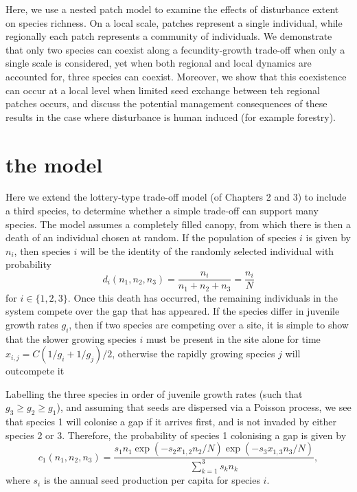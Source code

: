 Here, we use a nested patch model to examine the effects of disturbance extent on species richness. On a local scale, patches represent a single individual, while regionally each patch represents a community of individuals. We demonstrate that only two species can coexist along a fecundity-growth trade-off when only a single scale is considered, yet when both regional and local dynamics are accounted for, three species can coexist. Moreover, we show that this coexistence can occur at a local level when limited seed exchange between teh regional patches occurs, and discuss the potential management consequences of these results in the case where disturbance is human induced (for example forestry).



\section{the model}
Here we extend the lottery-type trade-off model (of Chapters 2 and 3) to include a third species, to determine whether a simple trade-off can support many species. The model assumes a completely filled canopy, from which there is then a death of an individual chosen at random. If the population of species $i$ is given by $n_i$, then species $i$ will be the identity of the randomly selected individual with probability
\begin{equation}
\label{d}
d_i(n_1,n_2,n_3)=\frac{n_i}{n_1+n_2+n_3}=\frac{n_i}{N} \end{equation}
for $i \in \{1,2,3\}$. Once this death has occurred, the remaining individuals in the system compete over the gap that has appeared. If the species differ in juvenile growth rates $g_i$, then if two species are competing over a site, it is simple to show that the slower growing species $i$ must be present in the site alone for time $x_{i,j}=C(1/g_i +1/g_j)/2$, otherwise the rapidly growing species $j$ will outcompete it

Labelling the three species in order of juvenile growth rates (such that $g_3 \geq g_2\geq g_1$), and assuming that seeds are dispersed via a Poisson process, we see that species 1 will colonise a gap if it arrives first, and is not invaded by either species 2 or 3. Therefore, the probability of species 1 colonising a gap is given by
\begin{equation}
\label{c1}
c_1(n_1,n_2,n_3)=\frac{s_1 n_1 \exp(-s_2x_{1,2}n_2/N)\exp(-s_3x_{1,3}n_3/N)}{\sum_{k=1}^3 s_k n_k},\end{equation}
where $s_i$ is the annual seed production per capita for species $i$.

